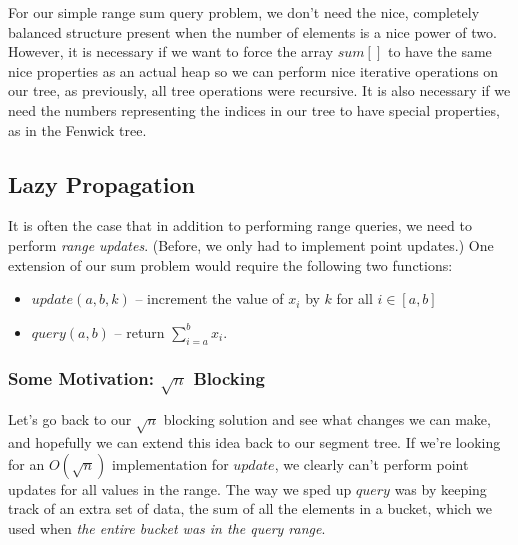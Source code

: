 For our simple range sum query problem, we don't need the nice, completely balanced structure present when the number of elements is a nice power of two. However, it is necessary if we want to force the array $sum[]$ to have the same nice properties as an actual heap so we can perform nice iterative operations on our tree, as previously, all tree operations were recursive. It is also necessary if we need the numbers representing the indices in our tree to have special properties, as in the Fenwick tree.

\subsection{Lazy Propagation}

It is often the case that in addition to performing range queries, we need to perform \textit{range updates}. (Before, we only had to implement point updates.) One extension of our sum problem would require the following two functions:

\begin{itemize}
\item
$update(a, b, k)$ -- increment the value of $x_i$ by $k$ for all $i\in [a,b]$

\item
$query(a, b)$ -- return $\sum_{i=a}^b x_i$.
\end{itemize}

\subsubsection{Some Motivation: $\sqrt{n}$ Blocking}

Let's go back to our $\sqrt{n}$ blocking solution and see what changes we can make, and hopefully we can extend this idea back to our segment tree. If we're looking for an $O(\sqrt{n})$ implementation for $update$, we clearly can't perform point updates for all values in the range. The way we sped up $query$ was by keeping track of an extra set of data, the sum of all the elements in a bucket, which we used when \textit{the entire bucket was in the query range}.

